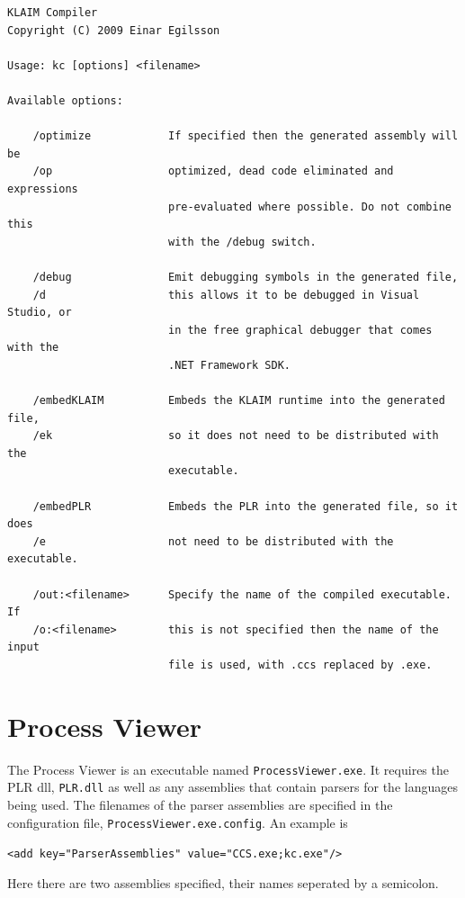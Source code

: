 	\begin{footnotesize}
	\begin{verbatim}
KLAIM Compiler
Copyright (C) 2009 Einar Egilsson

Usage: kc [options] <filename>

Available options:

    /optimize            If specified then the generated assembly will be
    /op                  optimized, dead code eliminated and expressions
                         pre-evaluated where possible. Do not combine this
                         with the /debug switch.
    
    /debug               Emit debugging symbols in the generated file,
    /d                   this allows it to be debugged in Visual Studio, or
                         in the free graphical debugger that comes with the
                         .NET Framework SDK.

    /embedKLAIM          Embeds the KLAIM runtime into the generated file, 
    /ek                  so it does not need to be distributed with the 
                         executable.

    /embedPLR            Embeds the PLR into the generated file, so it does
    /e                   not need to be distributed with the executable.

    /out:<filename>      Specify the name of the compiled executable. If 
    /o:<filename>        this is not specified then the name of the input
                         file is used, with .ccs replaced by .exe.

	\end{verbatim}
	\end{footnotesize}


\section{Process Viewer}

	The Process Viewer is an executable named \texttt{ProcessViewer.exe}. It 
	requires the PLR dll, \texttt{PLR.dll} as well as any assemblies that contain
	parsers for the languages being used. The filenames of the parser assemblies
	are specified in the configuration file, \texttt{ProcessViewer.exe.config}. 
	An example is 
	
	\texttt{<add key="ParserAssemblies" value="CCS.exe;kc.exe"/>}
	
	Here there are two assemblies specified, their names seperated by a 
	semicolon. 
	
